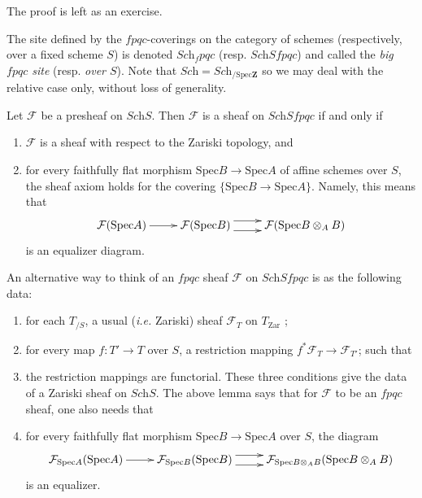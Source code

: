 The proof is left as an exercise.

\begin{definition}
The site defined by the $fpqc$-coverings on the category of schemes (respectively, over a fixed scheme $S$) is denoted $\textit{Sch}_fpqc$ (resp. $\textit{Sch}Sfpqc$)  and called the \emph{big $fpqc$ site} (resp. \emph{over $S$}). Note that $\textit{Sch} = \textit{Sch}_{/\text{Spec}\mathbf{Z}}$ so we may deal with the relative case only, without loss of generality. 
\end{definition}

\begin{lemma}\label{fpqc-sheaves}
Let $\mathcal{F}$ be a presheaf on $\textit{Sch}S$. Then $\mathcal{F}$ is a sheaf on $\textit{Sch}Sfpqc$ if and only if
\begin{enumerate}
\item $\mathcal{F}$ is a sheaf with respect to the Zariski topology, and
\item for every faithfully flat morphism $\text{Spec} B \to \text{Spec} A$ of affine schemes over $S$, the sheaf axiom holds for the covering $\{\text{Spec} B \to \text{Spec} A\}$. Namely, this means that 
$$
\xymatrix{
\mathcal{F}(\text{Spec} A) \ar[r] &
\mathcal{F}(\text{Spec} B) \ar@<1ex>[r] \ar@<-1ex>[r] &
\mathcal{F}(\text{Spec} B \otimes_A B)
}
$$
is an equalizer diagram.
\end{enumerate}
\end{lemma}

An alternative way to think of an $fpqc$ sheaf $\mathcal{F}$ on $\textit{Sch}Sfpqc$ is as the following data:
\begin{enumerate}
\item for each $T_{/S}$, a usual ({\it i.e.} Zariski) sheaf $\mathcal{F}_T$ on $T_{\mathrm{Zar}}$ ;
\item for every map $f : T' \to T$ over $S$, a restriction mapping $f^* \mathcal{F}_T \to \mathcal{F}_{T'} $; such that
\item the restriction mappings are functorial. These three conditions give the data of a Zariski sheaf on $\textit{Sch}S$. The above lemma says that for $\mathcal{F}$ to be an $fpqc$ sheaf, one also needs that
\item for every faithfully flat morphism $\text{Spec} B \to \text{Spec} A$ over $S$, the diagram 
$$
\xymatrix{
\mathcal{F}_{\text{Spec} A}(\text{Spec} A) \ar[r] &
\mathcal{F}_{\text{Spec} B}(\text{Spec} B) \ar@<1ex>[r] \ar@<-1ex>[r] &
\mathcal{F}_{\text{Spec} B \otimes_A B}(\text{Spec} B \otimes_A B)
}
$$
is an equalizer.
\end{enumerate}

